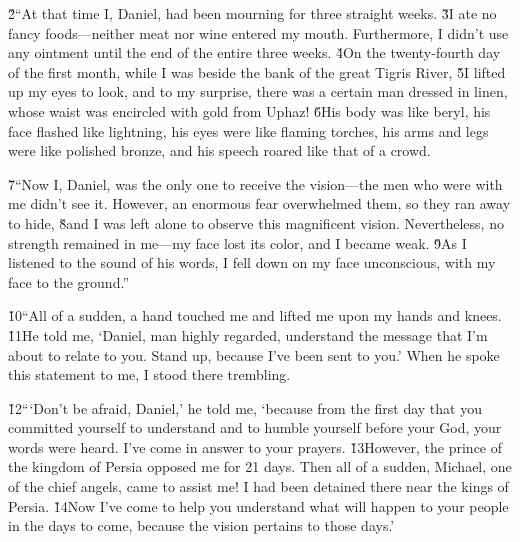 \v{2}``At that time I, Daniel, had been mourning for three straight weeks. \v{3}I ate no fancy foods---neither meat nor wine entered my mouth. Furthermore, I didn't use any ointment until the end of the entire three weeks. \v{4}On the twenty-fourth day of the first month, while I was beside the bank of the great Tigris River, \v{5}I lifted up my eyes to look, and to my surprise, there was a certain man dressed in linen, whose waist was encircled with gold from Uphaz! \v{6}His body was like beryl, his face flashed like lightning, his eyes were like flaming torches, his arms and legs were like polished bronze, and his speech roared like that of a crowd.

\v{7}``Now I, Daniel, was the only one to receive the vision---the men who were with me didn't see it. However, an enormous fear overwhelmed them, so they ran away to hide, \v{8}and I was left alone to observe this magnificent vision. Nevertheless, no strength remained in me---my face lost its color, and I became weak. \v{9}As I listened to the sound of his words, I fell down on my face unconscious, with my face to the ground.''

\v{10}``All of a sudden, a hand touched me and lifted me upon my hands and knees. \v{11}He told me, `Daniel, man highly regarded, understand the message that I'm about to relate to you. Stand up, because I've been sent to you.' When he spoke this statement to me, I stood there trembling.

\v{12}```Don't be afraid, Daniel,' he told me, `because from the first day that you committed yourself to understand and to humble yourself before your God, your words were heard. I've come in answer to your prayers. \v{13}However, the prince of the kingdom of Persia opposed me for 21 days. Then all of a sudden, Michael, one of the chief angels, came to assist me! I had been detained there near the kings of Persia. \v{14}Now I've come to help you understand what will happen to your people in the days to come, because the vision pertains to those days.'

